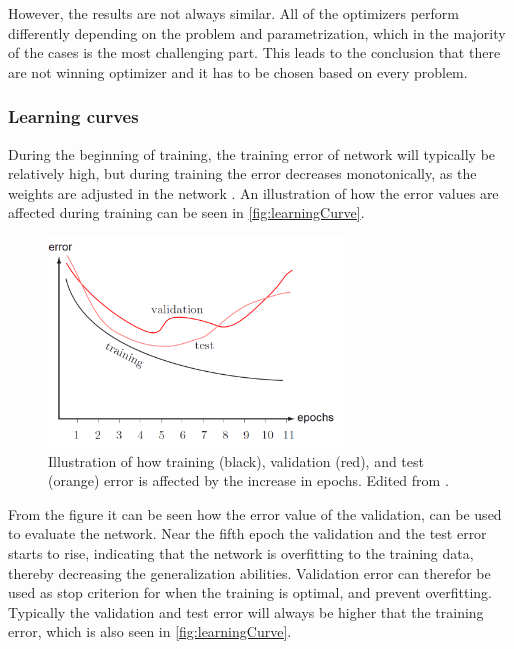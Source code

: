 However, the results are not always similar. All of the optimizers perform differently depending on the problem and parametrization, which in the majority of the cases is the most challenging part. This leads to the conclusion that there are not winning optimizer and it has to be chosen based on every problem.\citep{Int82016}





\subsubsection{Learning curves}
During the beginning of training, the training error of network will typically be relatively high, but during training the error decreases monotonically, as the weights are adjusted in the network \citep{Duda2000}. An illustration of how the error values are affected during training can be seen in \autoref{fig:learningCurve}.

\begin{figure} [H]
\centering
\includegraphics[width=0.7\textwidth]{figures/learningCurves}
\caption{Illustration of how training (black), validation (red), and test (orange) error is affected by the increase in epochs. Edited from \citep{Duda2000}.}
\label{fig:learningCurve}
\end{figure}

From the figure it can be seen how the error value of the validation, can be used to evaluate the network. 
Near the fifth epoch the validation and the test error starts to rise, indicating that the network is overfitting to the training data, thereby decreasing the generalization abilities. 
Validation error can therefor be used as stop criterion for when the training is optimal, and prevent overfitting. 
Typically the validation and test error will always be higher that the training error, which is also seen in \autoref{fig:learningCurve}. \citep{Duda2000}


